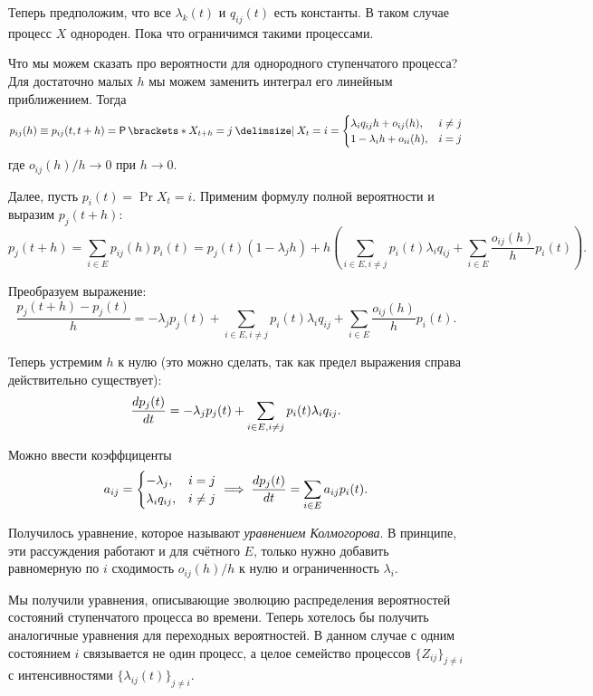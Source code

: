 Теперь предположим, что все \(\lambda_{k}(t)\) и \(q_{ij}(t)\) есть константы. 
В таком случае процесс \(X\) однороден. Пока что ограничимся такими процессами.

Что мы можем сказать про вероятности для однородного ступенчатого процесса? Для 
достаточно малых \(h\) мы можем заменить интеграл его линейным приближением. 
Тогда
\[
	p_{ij}(h) \equiv p_{ij}(t, t + h) = \Pr{X_{t + h} = j \given X_{t} = i} =
	\begin{cases}
	\lambda_{i}q_{ij}h + o_{ij}(h), & i \neq j \\
	1 - \lambda_{i}h + o_{ii}(h), & i = j
	\end{cases}
\]
где \(o_{ij}(h)/h \to 0\) при \(h \to 0\).

Далее, пусть \(p_{i}(t) = \Pr{X_{t} = i}\). Применим формулу полной вероятности 
и выразим \(p_{j}(t + h)\):
\[
	p_{j}(t + h) = \sum_{i \in E} p_{ij}(h)p_{i}(t) = p_{j}(t)(1 - 
	\lambda_{j}h) + h\left(\sum_{i \in E, i \neq j}p_{i}(t)\lambda_{i}q_{ij} 
	+ \sum_{i \in E}\frac{o_{ij}(h)}{h}p_{i}(t)\right).
\]

Преобразуем выражение:
\[
	\frac{p_{j}(t + h) - p_{j}(t)}{h} = -\lambda_{j}p_{j}(t) + \sum_{i \in E, i 
	\neq j}p_{i}(t)\lambda_{i}q_{ij} + \sum_{i \in E} \frac{o_{ij}(h)}{h} 
	p_{i}(t).
\]

Теперь устремим \(h\) к нулю (это можно сделать, так как предел выражения 
справа действительно существует):
\[
	\frac{\mathop{}\!d p_{j}(t)}{\mathop{}\!d t} = -\lambda_{j}p_{j}(t) + \sum_{i \in E, i 
	\neq j}p_{i}(t)\lambda_{i}q_{ij}.
\]

Можно ввести коэффциценты
\[
	a_{ij} = \begin{cases}
	-\lambda_{j}, & i = j \\
	\lambda_{i}q_{ij}, & i \neq j
	\end{cases}
	\implies 
	\frac{\mathop{}\!d p_{j}(t)}{\mathop{}\!d t} = \sum_{i \in E}a_{ij}p_{i}(t).
\]

Получилось уравнение, которое называют \emph{уравнением Колмогорова}. В 
принципе, эти рассуждения работают и для счётного \(E\), только нужно добавить 
равномерную по \(i\) сходимость \(o_{ij}(h)/h\) к нулю и ограниченность  
\(\lambda_{i}\).

Мы получили уравнения, описывающие эволюцию распределения вероятностей 
состояний ступенчатого процесса во времени. Теперь хотелось бы получить 
аналогичные уравнения для переходных вероятностей. В данном случае с одним 
состоянием \(i\) связывается не один процесс, а целое семейство процессов 
\(\{Z_{ij}\}_{j \neq i}\) с интенсивностями \(\{\lambda_{ij}(t)\}_{j \neq i}\).


